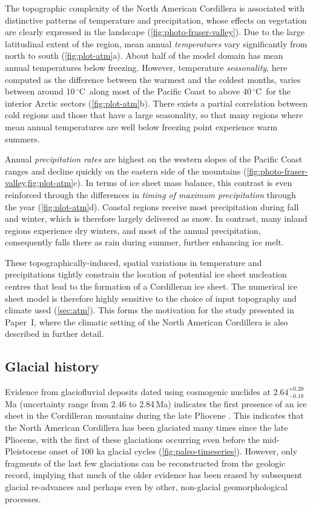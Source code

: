 \documentclass[a4paper]{kappa}
\newcommand{\unit}[1]{\ensuremath{\mathrm{#1}}}
\newcommand{\degree}[0]{\ensuremath{^{\circ}}}
\newcommand{\degC}[0]{\unit{{\degree}C}}
\newcommand{\CCLI}[0]{Paper~I}      %
\begin{document}
The topographic complexity of the North American Cordillera is associated with
distinctive patterns of temperature and precipitation, whose effects on
vegetation are clearly expressed in the landscape
(\cref{fig:photo-fraser-valley}). Due to the large latitudinal extent of the
region, mean annual \emph{temperatures} vary significantly from north to south
(\cref{fig:plot-atm}a). About half of the model domain has mean annual
temperatures below freezing. However, temperature \emph{seasonality},
here computed as the difference between the warmest and the coldest months,
varies between around 10\,\degC\ along most of the Pacific Coast to above
40\,\degC\ for the interior Arctic sectors
(\cref{fig:plot-atm}b). There exists a
partial correlation between cold regions and those that have a large
seasonality, so that many regions where mean annual temperatures are well below
freezing point experience warm summers.

Annual \emph{precipitation rates} are highest on the western slopes of the
Pacific Coast ranges and decline quickly on the eastern side of the mountains
(\cref{fig:photo-fraser-valley,fig:plot-atm}c). In terms of ice sheet
mass balance, this contrast is even reinforced through the differences in
\emph{timing of maximum precipitation} through the year (\cref{fig:plot-atm}d).
Coastal regions receive most precipitation during fall and winter, which is
therefore largely delivered as snow. In contrast, many inland regions
experience dry winters, and most of the annual precipitation, consequently
falls there as rain during summer, further enhancing ice melt.

These topographically-induced, spatial variations in temperature and
precipitations tightly constrain the location of potential ice sheet nucleation
centres that lead to the formation of a Cordilleran ice sheet. The numerical
ice sheet model is therefore highly sensitive to the choice of input topography
and climate used (\cref{sec:atm}). This forms the motivation for the study
presented in \CCLI, where the climatic setting of the North American Cordillera
is also described in further detail.

\subsection{Glacial history}

Evidence from glaciofluvial deposits dated using cosmogenic nuclides at
$2.64^{+0.20}_{-0.18}$\,Ma (uncertainty range from 2.46 to 2.84\,Ma)
indicates the first presence of an ice sheet in the
Cordilleran mountains during the late Pliocene \citep{Hidy.etal.2013}.
This indicates that the North American Cordillera has been glaciated many times
since the late Pliocene, with the first of these glaciations occurring even
before the mid-Pleistocene onset of 100 ka glacial cycles
(\cref{fig:paleo-timeseries}). However, only fragments of the last few
glaciations can be reconstructed from the geologic record, implying that much
of the older evidence has been erased by subsequent glacial re-advances and
perhaps even by other, non-glacial geomorphological processes.
\end{document}
